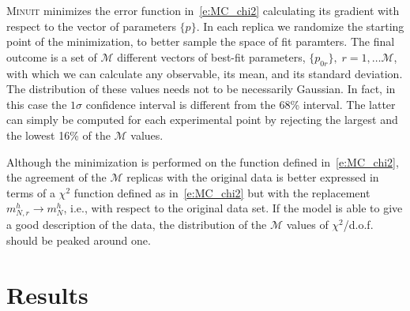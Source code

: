 \documentclass[aps,preprintnumbers,showpacs,nofootinbib,superscriptaddress,floatfix]{revtex4}
\newcommand{\AS}[1]{{\textcolor[rgb]{1,0,1}{#1}}}
\newcommand{\minuit}{\textsc{Minuit }}
\begin{document}
\minuit minimizes the error function in~\eqref{e:MC_chi2} calculating its gradient with respect to the vector of parameters $\{p\}$. 
\AS{In each replica we randomize the starting point of the minimization, to better sample the space of fit paramters.} 
The final outcome is a set of $\mathcal{M}$ different vectors of best-fit parameters, $\{ p_{0r}\},\; r=1,\ldots \mathcal{M}$, with which we can calculate any observable, its mean, and its standard deviation. 
The distribution of these values needs not to be necessarily Gaussian. In fact, in this case the $1 \sigma$ confidence interval is different from the 68\% interval. 
The latter can simply be computed for each experimental point by rejecting the largest and the lowest 16\% of the $\mathcal{M}$ values.   

Although the minimization is performed on the function defined in~\eqref{e:MC_chi2}, the agreement of the $\mathcal{M}$ replicas with the original data is better expressed in terms of a $\chi^2$ function defined as in~\eqref{e:MC_chi2} but with the replacement $m_{N, r}^{h} \to m_{N}^{h}$, i.e.,  with respect to the original data set. If the model is able to give a good description of the data, the distribution of the $\mathcal{M}$ values of $\chi^2$/d.o.f. should be peaked around one. 














\section{Results}
\label{s:results}
\end{document}
